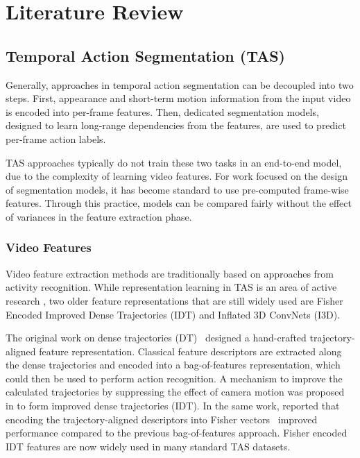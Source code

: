 \chapter{Literature Review}
\label{ch:lit_rev}

\section{Temporal Action Segmentation (TAS)}

Generally, approaches in temporal action segmentation can be decoupled into two steps. First, appearance and short-term motion information from the input video is encoded into per-frame features. Then, dedicated segmentation models, designed to learn long-range dependencies from the features, are used to predict per-frame action labels.

TAS approaches typically do not train these two tasks in an end-to-end model, due to the complexity of learning video features. For work focused on the design of segmentation models, it has become standard to use pre-computed frame-wise features. Through this practice, models can be compared fairly without the effect of variances in the feature extraction phase.

\subsection{Video Features}
Video feature extraction methods are traditionally based on approaches from activity recognition. While representation learning in TAS is an area of active research \cite{li2022bridge,ishihara2022mcfm}, two older feature representations that are still widely used are Fisher Encoded Improved Dense Trajectories (IDT) and Inflated 3D ConvNets (I3D).

The original work on dense trajectories (DT)~\cite{wang2011dt} designed a hand-crafted trajectory-aligned feature representation. Classical feature descriptors are extracted along the dense trajectories and encoded into a bag-of-features representation, which could then be used to perform action recognition. A mechanism to improve the calculated trajectories by suppressing the effect of camera motion was proposed in \cite{wang2013action} to form improved dense trajectories (IDT). In the same work, \citeauthor{wang2013action} reported that encoding the trajectory-aligned descriptors into Fisher vectors~\cite{perronnin2010fisher} improved performance compared to the previous bag-of-features approach. Fisher encoded IDT features are now widely used in many standard TAS datasets.

